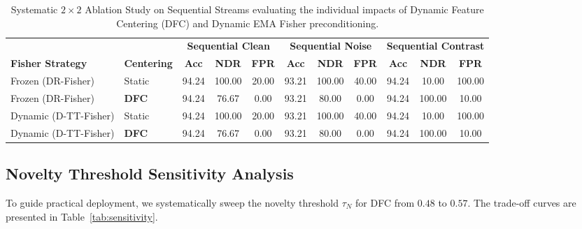 \documentclass{article}
\theoremstyle{plain}
\theoremstyle{definition}
\theoremstyle{remark}
\begin{document}
\begin{table}[t]
\caption{Systematic $2 \times 2$ Ablation Study on Sequential Streams evaluating the individual impacts of Dynamic Feature Centering (DFC) and Dynamic EMA Fisher preconditioning.}
\label{tab:ablation}
\vskip 0.15in
\begin{center}
\begin{small}
\begin{tabular}{ll|ccc|ccc|ccc}
\toprule
&& \multicolumn{3}{c|}{\textbf{Sequential Clean}} & \multicolumn{3}{c|}{\textbf{Sequential Noise}} & \multicolumn{3}{c}{\textbf{Sequential Contrast}} \\
\textbf{Fisher Strategy} & \textbf{Centering} & \textbf{Acc} & \textbf{NDR} & \textbf{FPR} & \textbf{Acc} & \textbf{NDR} & \textbf{FPR} & \textbf{Acc} & \textbf{NDR} & \textbf{FPR} \\
\midrule
Frozen (DR-Fisher) & Static & 94.24 & 100.00 & 20.00 & 93.21 & 100.00 & 40.00 & 94.24 & 10.00 & 100.00 \\
Frozen (DR-Fisher) & \textbf{DFC} & 94.24 & 76.67 & 0.00 & 93.21 & 80.00 & 0.00 & 94.24 & 100.00 & 10.00 \\
Dynamic (D-TT-Fisher) & Static & 94.24 & 100.00 & 20.00 & 93.21 & 100.00 & 40.00 & 94.24 & 10.00 & 100.00 \\
Dynamic (D-TT-Fisher) & \textbf{DFC} & 94.24 & 76.67 & 0.00 & 93.21 & 80.00 & 0.00 & 94.24 & 100.00 & 10.00 \\
\bottomrule
\end{tabular}
\end{small}
\end{center}
\vskip -0.1in
\end{table}

\subsection{Novelty Threshold Sensitivity Analysis}
To guide practical deployment, we systematically sweep the novelty threshold $\tau_N$ for DFC from $0.48$ to $0.57$. The trade-off curves are presented in Table~\ref{tab:sensitivity}.
\end{document}
